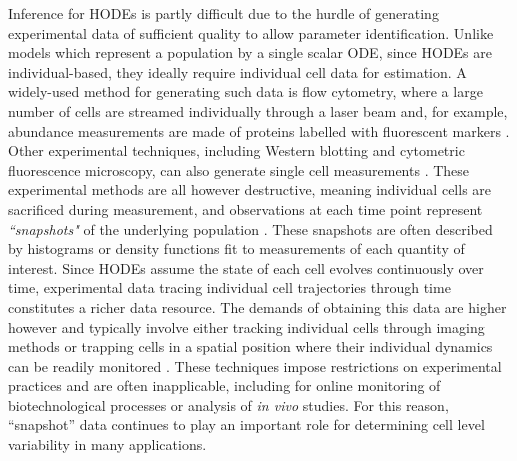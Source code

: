 Inference for HODEs is partly difficult due to the hurdle of generating experimental data of sufficient quality to allow parameter identification. Unlike models which represent a population by a single scalar ODE, since HODEs are individual-based, they ideally require individual cell data for estimation. A widely-used method for generating such data is flow cytometry, where a large number of cells are streamed individually through a laser beam and, for example, abundance measurements are made of proteins labelled with fluorescent markers \cite{telford2012flow}. Other experimental techniques, including Western blotting and cytometric fluorescence microscopy, can also generate single cell measurements \cite{hughes2014single,hasenauer2011identification}. These experimental methods are all however destructive, meaning individual cells are sacrificed during measurement, and  observations at each time point represent \emph{``snapshots"} of the underlying population \cite{hasenauer2011identification}. These snapshots are often described by histograms \cite{dixit2018maximum} or density functions \cite{waldherr2018estimation} fit to measurements of each quantity of interest. Since HODEs assume the state of each cell evolves continuously over time, experimental data tracing individual cell trajectories through time constitutes a richer data resource. The demands of obtaining this data are higher however and typically involve either tracking individual cells through imaging methods \cite{hilsenbeck2016software} or trapping cells in a spatial position where their individual dynamics can be readily monitored \cite{fritzsch2012single}. These techniques impose restrictions on experimental practices and are often inapplicable, including for online monitoring of biotechnological processes or analysis of \textit{in vivo} studies. For this reason, ``snapshot'' data continues to play an important role for determining cell level variability in many applications.

